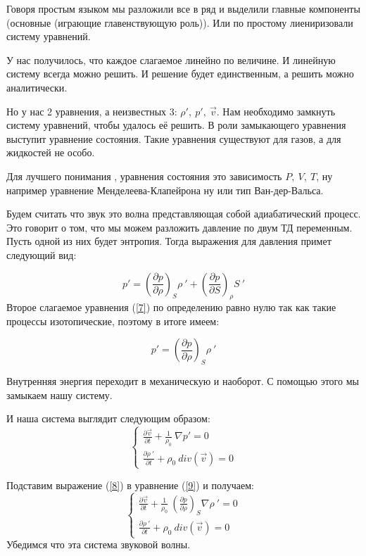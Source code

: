 \documentclass[14pt,a4paper,oneside]{extarticle}	%
\begin{document}
Говоря простым языком мы разложили все в ряд и выделили главные компоненты (основные (играющие главенствующую роль)). Или по простому лиениризовали систему уравнений.

У нас получилось, что каждое слагаемое линейно по величине. И линейную систему всегда можно решить. И решение будет единственным, а решить можно аналитически.

Но у нас 2 уравнения, а неизвестных 3: $ \rho' , \: p', \: \vec{v} $. Нам необходимо замкнуть систему уравнений, чтобы удалось её решить. 
В роли замыкающего уравнения выступит уравнение состояния.
Такие уравнения существуют для газов, а для жидкостей не особо. 

Для лучшего понимания , уравнения состояния это зависимость $ P,\:V,\:T $, ну например уравнение Менделеева-Клапейрона ну или тип Ван-дер-Вальса.

Будем считать что звук это волна представляющая собой адиабатический процесс.
Это говорит о том, что мы можем разложить давление по двум ТД переменным. Пусть одной из них будет энтропия.
Тогда выражения для давления примет следующий вид:

\begin{equation}\label{7}
p' = \left( \frac{\partial p}{\partial \rho} \right)_{S}  \rho\:' + \left( \frac{\partial p}{\partial S} \right)_{\rho}  S\:'
\end{equation}
Второе слагаемое уравнения (\ref{7}) по определению равно нулю так как такие процессы изотопические, поэтому в итоге имеем:

\begin{equation}\label{8}
p' = \left( \frac{\partial p}{\partial \rho} \right)_{S}  \rho\:'
\end{equation}

Внутренняя энергия переходит в механическую и наоборот.
С помощью этого мы замыкаем нашу систему.

И наша система выглядит следующим образом:
 \begin{equation}\label{9}
  \begin{cases}
  \frac{\partial \vec{v}}{\partial t} + \frac{1}{\rho_{0}}\: \nabla p' = 0 \\
  \frac{\partial \rho\:'}{\partial t} + \rho_{0}\: div(\vec{v}) = 0
 \end{cases}
 \end{equation}

Подставим выражение (\ref{8}) в уравнение (\ref{9}) и получаем:
 \begin{equation}\label{10}
\begin{cases}
\frac{\partial \vec{v}}{\partial t} + \frac{1}{\rho_{0}}\:\left( \frac{\partial p}{\partial \rho} \right)_{S} \nabla \rho\:' = 0 \\
\frac{\partial \rho\:'}{\partial t} + \rho_{0}\: div(\vec{v}) = 0
\end{cases}
\end{equation}
Убедимся что эта система звуковой волны.
\end{document}
